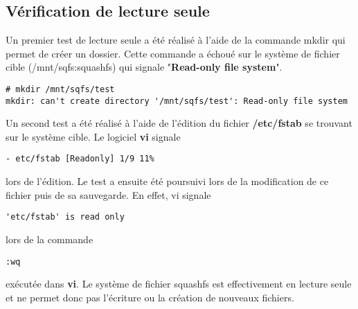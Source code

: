 \subsection{Vérification de lecture seule}
Un premier test de lecture seule a été réalisé à l'aide de la commande mkdir qui permet de créer un dossier. Cette commande a échoué sur le système de fichier cible (/mnt/sqfs:squashfs) qui signale "\textbf{Read-only file system}".
\begin{lstlisting}
# mkdir /mnt/sqfs/test
mkdir: can't create directory '/mnt/sqfs/test': Read-only file system
\end{lstlisting}

Un second test a été réalisé à l'aide de l'édition du fichier \textbf{/etc/fstab} se trouvant sur le système cible. Le logiciel \textbf{vi} signale
\begin{lstlisting}[style=Bash]
- etc/fstab [Readonly] 1/9 11%
\end{lstlisting}
lors de l'édition. Le test a ensuite été poursuivi lors de la modification de ce fichier puis de sa sauvegarde. En effet, vi signale
\begin{lstlisting}[style=Bash]
'etc/fstab' is read only
\end{lstlisting}
lors de la commande
\begin{lstlisting}[style=Bash]
:wq
\end{lstlisting}
exécutée dans \textbf{vi}. Le système de fichier squashfs est effectivement en lecture seule et ne permet donc pas l'écriture ou la création de nouveaux fichiers.
